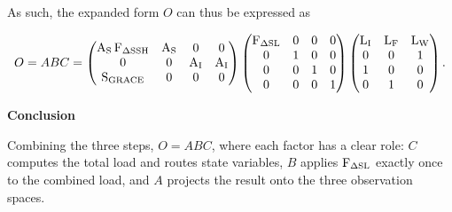 As such, the expanded form $O$ can thus be expressed as

\begin{equation}
    O = ABC = \begin{pmatrix}
        \operatorname{{A}}_{{\mathrm{S}}} \operatorname{{F}}_{{\Delta \mathrm{SSH}}} & \operatorname{{A}}_{{\mathrm{S}}} & 0 & 0 \\
        0 & 0 & \operatorname{{A}}_{{\mathrm{I}}} & \operatorname{{A}}_{{\mathrm{I}}} \\
        \operatorname{{S}}_{{\mathrm{GRACE}}} & 0 & 0 & 0
    \end{pmatrix}
    \begin{pmatrix}
        \operatorname{{F}}_{{\Delta \mathrm{SL}}} & 0 & 0 & 0 \\
        0 & 1 & 0 & 0 \\
        0 & 0 & 1 & 0 \\
        0 & 0 & 0 & 1
    \end{pmatrix}
    \begin{pmatrix}
        \operatorname{{L}}_{{\text{I}}} & \operatorname{{L}}_{{\text{F}}} & \operatorname{{L}}_{{\text{W}}} \\
        0 & 0 & 1 \\
        1 & 0 & 0 \\
        0 & 1 & 0
    \end{pmatrix}.
\end{equation}

\textbf{Conclusion}

Combining the three steps, $O = ABC$, where each factor has a clear role: $C$ computes the total load and routes state variables, $B$ applies $\operatorname{{F}}_{{\Delta \mathrm{SL}}}$ exactly once to the combined load, and $A$ projects the result onto the three observation spaces.
